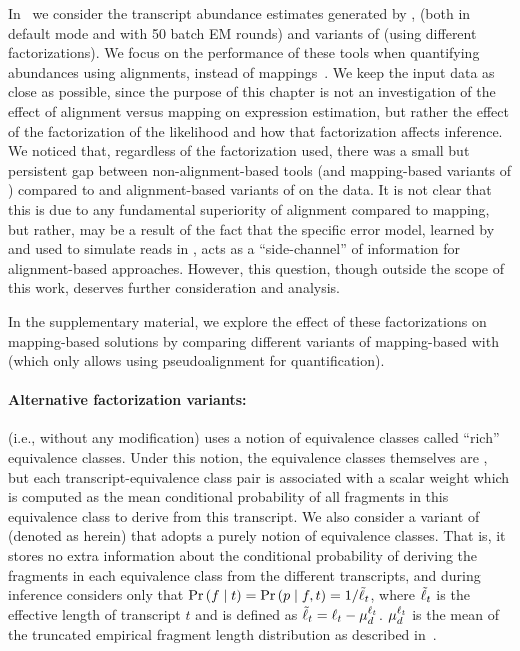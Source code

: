 In~ we consider the transcript
abundance estimates generated by \rsem, \express (both in default mode and with 
50 batch EM rounds) and variants of \salmon (using different factorizations). 
We focus on the performance of these tools when quantifying
abundances using alignments, instead of mappings~\citep{Srivastava2016rapmap}.
We keep the input data as close as possible, since the purpose of this chapter is
not an investigation of the effect of alignment versus mapping on expression
estimation, but rather the effect of the factorization of the likelihood and how
that factorization affects inference. We noticed that, regardless of the
factorization used, there was a small but persistent gap between non-alignment-based
tools (\kallisto and mapping-based variants of \salmon) compared to \rsem and 
alignment-based variants of \salmon on the \rsemsim data. It is not clear that 
this is due to any fundamental superiority of alignment compared to mapping, 
but rather, may be a result of the fact that the specific error model, learned 
by \rsem and used to simulate reads in \rsemsim, acts as a ``side-channel'' of 
information for alignment-based approaches.  However, this question, though 
outside the scope of this work, deserves further consideration and analysis.

In the supplementary material, we explore the effect of these factorizations on
mapping-based solutions by comparing different variants of mapping-based \salmon
with \kallisto (which only allows using pseudoalignment for quantification).

\paragraph{Alternative factorization variants:} \salmon (i.e., without any
modification) uses a \cb notion of equivalence classes called ``rich''
equivalence classes. Under this notion, the equivalence classes themselves are
\cb, but each transcript-equivalence class pair is associated with a scalar
weight which is computed as the mean conditional probability of all fragments in
this equivalence class to derive from this transcript. We also consider a
variant of \salmon (denoted as \salmonu herein) that adopts a purely \cb notion
of equivalence classes. That is, it stores no extra information about the
conditional probability of deriving the fragments in each equivalence class from
the different transcripts, and during inference considers only that $\Prob{f}{t}
= \Prob{p}{f,t} = 1 / \elength{t}$, where $\tilde{\ell}_{t}$ is the effective length
of transcript $t$ and is defined as $\tilde{\ell}_{t} = \ell_{t}-
\mu_d^{\ell_{t}}$. $\mu_d^{\ell_{t}}$ is the mean of the truncated empirical
fragment length distribution as described in~\citep{Patro2017Salmon}.

